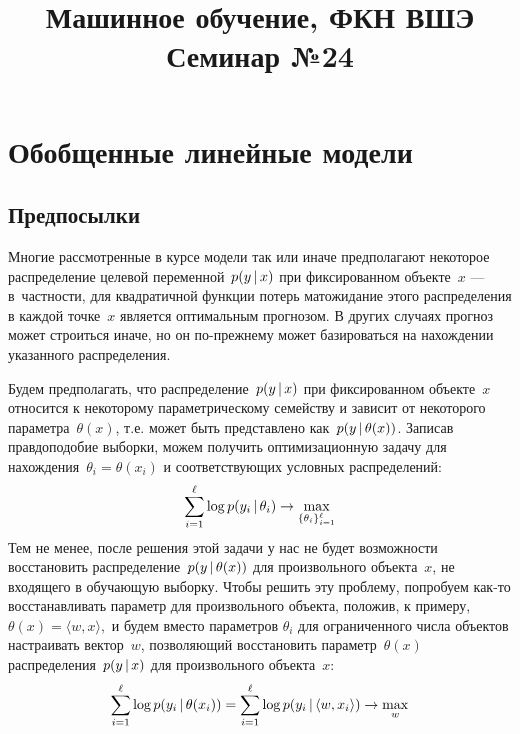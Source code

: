 \documentclass[12pt,a4paper]{article}
\title{Машинное обучение, ФКН ВШЭ\\Семинар №24}
\begin{document}
\author{}
\date{}
\maketitle
 
\section{Обобщенные линейные модели}
    \subsection{Предпосылки}
    \par Многие рассмотренные в курсе модели так или иначе предполагают некоторое распределение целевой переменной~$p(y \mspace{3mu}{|}\mspace{3mu} x)$ при фиксированном объекте~$x$ — в~частности, для квадратичной функции потерь матожидание этого распределения в каждой точке~$x$ является оптимальным прогнозом. В других случаях прогноз может строиться иначе, но он по-прежнему может базироваться на нахождении указанного распределения.
    \par Будем предполагать, что распределение~$p(y \mspace{3mu}{|}\mspace{3mu} x)$ при фиксированном объекте~$x$ относится к некоторому параметрическому семейству и зависит от некоторого параметра~$\theta(x)$, т.е. может быть представлено как~$p(y \mspace{3mu}{|}\mspace{3mu} \theta(x))$. Записав правдоподобие выборки, можем получить оптимизационную задачу для нахождения~$\theta_i = \theta(x_i)$ и соответствующих условных распределений:
    \begin{equation}
        \sum_{i=1}^\ell \log p(y_i \mspace{3mu}{|}\mspace{3mu} \theta_i) \to \max_{\{\theta_i\}_{i=1}^\ell}
    \end{equation}
    Тем не менее, после решения этой задачи у нас не будет возможности восстановить распределение~$p(y \mspace{3mu}{|}\mspace{3mu} \theta(x))$ для произвольного объекта~$x$, не входящего в обучающую выборку. Чтобы решить эту проблему, попробуем как-то восстанавливать параметр для произвольного объекта, положив, к примеру, $\theta(x) = \langle w, x \rangle,$ и будем вместо параметров $\theta_i$ для ограниченного числа объектов настраивать вектор~$w$, позволяющий восстановить параметр~$\theta(x)$ распределения~$p(y \mspace{3mu}{|}\mspace{3mu} x)$ для произвольного объекта~$x$:
    \begin{equation}
        \sum_{i=1}^\ell \log p(y_i \mspace{3mu}{|}\mspace{3mu} \theta(x_i)) = \sum_{i=1}^\ell \log p(y_i \mspace{3mu}{|}\mspace{3mu} \langle w, x_i \rangle) \to \max_{w}
    \end{equation}
    
\end{document}
